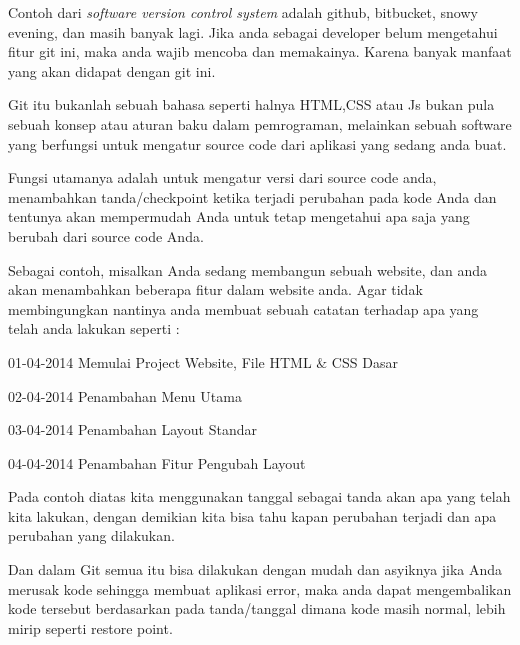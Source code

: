  \vspace{\baselineskip}
\noindent 
Contoh dari $  $\textit{software version control system} $  $adalah github, bitbucket, snowy evening, dan masih banyak lagi. Jika anda sebagai developer belum mengetahui fitur git ini, maka anda wajib mencoba dan memakainya. Karena banyak manfaat yang akan didapat dengan git ini. \par
\noindent 
Git itu bukanlah sebuah bahasa seperti halnya HTML,CSS atau Js bukan pula sebuah konsep atau aturan baku dalam pemrograman, melainkan sebuah software yang berfungsi untuk mengatur source code dari aplikasi yang sedang anda buat. \par
\vspace{12pt}
\noindent 
Fungsi utamanya adalah untuk mengatur versi dari source code anda, menambahkan tanda/checkpoint ketika terjadi perubahan pada kode Anda dan tentunya akan mempermudah Anda untuk tetap mengetahui apa saja yang berubah dari source code Anda. \par
\noindent 
Sebagai contoh, misalkan Anda sedang membangun sebuah website, dan anda akan menambahkan beberapa fitur dalam website anda. Agar tidak membingungkan nantinya anda membuat sebuah catatan terhadap apa yang telah anda lakukan seperti : \par
\noindent 
 \hspace*{0.5in} 01-04-2014 Memulai Project Website, File HTML  $  \&  $ CSS Dasar \par
\noindent 
 \hspace*{0.5in} 02-04-2014 Penambahan Menu Utama \par
\noindent 
 \hspace*{0.5in} 03-04-2014 Penambahan Layout Standar \par
\noindent 
 \hspace*{0.5in} 04-04-2014 Penambahan Fitur Pengubah Layout \par
\vspace{\baselineskip}
\noindent 
Pada contoh diatas kita menggunakan tanggal sebagai tanda akan apa yang telah kita lakukan, dengan demikian kita bisa tahu kapan perubahan terjadi dan apa perubahan yang dilakukan.  \par
\vspace{\baselineskip}
\noindent 
Dan dalam Git semua itu bisa dilakukan dengan mudah dan asyiknya jika Anda merusak kode sehingga membuat aplikasi error, maka anda dapat mengembalikan kode tersebut berdasarkan pada tanda/tanggal dimana kode masih normal, lebih mirip seperti restore point. \par
